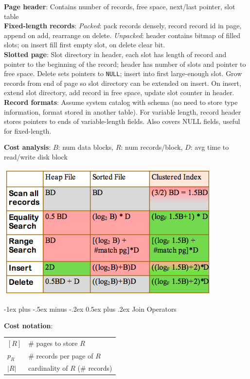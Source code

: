 \documentclass[10pt,landscape]{article}
\makeatletter
\renewcommand{\section}{\@startsection{section}{1}{0mm}%
                                {-1ex plus -.5ex minus -.2ex}%
                                {0.5ex plus .2ex}%
                                {\normalfont\large\bfseries}}
\makeatother
\begin{document}
\begin{multicols}{3}
\textbf{Page header}: Contains number of records, free space, next/last pointer, slot table \\
\textbf{Fixed-length records}: \textit{Packed}: pack records densely, record record id in page, append on add, rearrange on delete. \textit{Unpacked}: header contains bitmap of filled slots; on insert fill first empty slot, on delete clear bit. \\
\textbf{Slotted page}: Slot directory in header, each slot has length of record and pointer to the beginning of the record; header has number of slots and pointer to free space. Delete sets pointers to \texttt{NULL}; insert into first large-enough slot. Grow records from end of page so slot directory can be extended on insert. On insert, extend slot directory, add record in free space, update slot counter in header. \\
\textbf{Record formats}: Assume system catalog with schema (no need to store type information, format stored in another table). For variable length, record header stores pointers to ends of variable-length fields. Also covers NULL fields, useful for fixed-length.

\textbf{Cost analysis}: $B$: num data blocks, $R$: num records/block, $D$: avg time to read/write disk block

\centerline{\includegraphics[width=.65\linewidth]{costops.png}}


\section{Join Operators}

\textbf{Cost notation}:

\begin{tabular}{@{}ll@{}}
$[R]$   & \# pages to store $R$ \\
$p_R$   & \# records per page of $R$ \\
$|R|$   & cardinality of $R$ (\# records)
\end{tabular}


\end{multicols}
\end{document}
